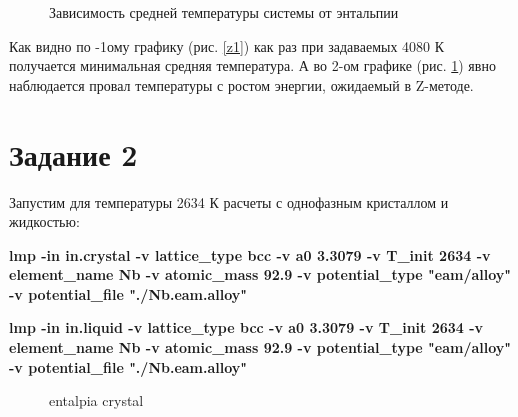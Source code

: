 \documentclass[a4paper,oneside,14pt]{extreport}
\begin{document}
\begin{figure}[!h]
	\caption{Зависимость средней температуры системы от энтальпии}
	\label{z2}
\end{figure}

\newpage
Как видно по -1ому графику (рис. \ref{z1}) как раз при задаваемых 4080 К получается минимальная средняя температура. А во 2-ом графике (рис. \ref{z2}) явно наблюдается провал температуры с ростом энергии, ожидаемый в Z-методе.

\newpage
\section*{Задание 2}
Запустим для температуры 2634 К расчеты с однофазным кристаллом и
жидкостью:

\textbf{lmp -in in.crystal -v lattice\_type bcc -v a0 3.3079 -v T\_init 2634 -v element\_name Nb -v atomic\_mass 92.9 -v potential\_type "eam/alloy" -v potential\_file "./Nb.eam.alloy"}

\textbf{lmp -in in.liquid -v lattice\_type bcc -v a0 3.3079 -v T\_init 2634 -v element\_name Nb -v atomic\_mass 92.9 -v potential\_type "eam/alloy" -v potential\_file "./Nb.eam.alloy"}

\begin{figure}[!h]
	\caption{entalpia crystal}
	\label{entalpia crystal}
\end{figure}
\end{document}
